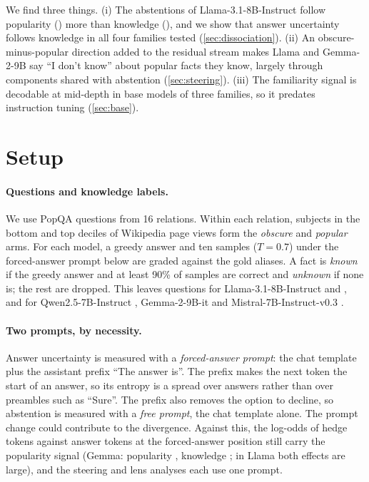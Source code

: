 \documentclass{article}
\newcommand{\idk}{``I don't know''}
\begin{document}
We find three things. (i) The abstentions of Llama-3.1-8B-Instruct follow popularity (\hmLlamaPopEff) more than knowledge (\hmLlamaKnowEff), and we show that answer uncertainty follows knowledge in all four families tested (\cref{sec:dissociation}). (ii) An obscure-minus-popular direction added to the residual stream makes Llama and Gemma-2-9B say \idk{} about popular facts they know, largely through components shared with abstention (\cref{sec:steering}). (iii) The familiarity signal is decodable at mid-depth in base models of three families, so it predates instruction tuning (\cref{sec:base}).

\section{Setup}
\label{sec:setup}

\paragraph{Questions and knowledge labels.} We use PopQA questions from 16 relations. Within each relation, subjects in the bottom and top deciles of Wikipedia page views form the \emph{obscure} and \emph{popular} arms. For each model, a greedy answer and ten samples ($T=0.7$) under the forced-answer prompt below are graded against the gold aliases. A fact is \emph{known} if the greedy answer and at least 90\% of samples are correct and \emph{unknown} if none is; the rest are dropped. This leaves \faLlamaN{} questions for Llama-3.1-8B-Instruct \citep{llama3} and \faQwenN, \faGemmaN{} and \faMistralN{} for Qwen2.5-7B-Instruct \citep{qwen25}, Gemma-2-9B-it \citep{gemma2} and Mistral-7B-Instruct-v0.3 \citep{mistral7b}.

\paragraph{Two prompts, by necessity.} Answer uncertainty is measured with a \emph{forced-answer prompt}: the chat template plus the assistant prefix ``The answer is''. The prefix makes the next token the start of an answer, so its entropy is a spread over answers rather than over preambles such as ``Sure''. The prefix also removes the option to decline, so abstention is measured with a \emph{free prompt}, the chat template alone. The prompt change could contribute to the divergence. Against this, the log-odds of hedge tokens against answer tokens at the forced-answer position still carry the popularity signal (Gemma: popularity \loGemmaPop, knowledge \loGemmaKnow; in Llama both effects are large), and the steering and lens analyses each use one prompt.
\end{document}
